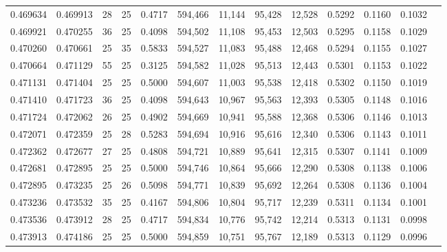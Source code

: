 \begin{tabular}{rrrrrrrrrrrrr}
0.469634 & 0.469913 &    28 &  25 &                                     0.4717 & 594,466 &  11,144 &  95,428 &  12,528 & 0.5292 & 0.1160 & 0.1032 \\
0.469921 & 0.470255 &    36 &  25 &                                     0.4098 & 594,502 &  11,108 &  95,453 &  12,503 & 0.5295 & 0.1158 & 0.1029 \\
0.470260 & 0.470661 &    25 &  35 &                                     0.5833 & 594,527 &  11,083 &  95,488 &  12,468 & 0.5294 & 0.1155 & 0.1027 \\
0.470664 & 0.471129 &    55 &  25 &                                     0.3125 & 594,582 &  11,028 &  95,513 &  12,443 & 0.5301 & 0.1153 & 0.1022 \\
0.471131 & 0.471404 &    25 &  25 &                                     0.5000 & 594,607 &  11,003 &  95,538 &  12,418 & 0.5302 & 0.1150 & 0.1019 \\
0.471410 & 0.471723 &    36 &  25 &                                     0.4098 & 594,643 &  10,967 &  95,563 &  12,393 & 0.5305 & 0.1148 & 0.1016 \\
0.471724 & 0.472062 &    26 &  25 &                                     0.4902 & 594,669 &  10,941 &  95,588 &  12,368 & 0.5306 & 0.1146 & 0.1013 \\
0.472071 & 0.472359 &    25 &  28 &                                     0.5283 & 594,694 &  10,916 &  95,616 &  12,340 & 0.5306 & 0.1143 & 0.1011 \\
0.472362 & 0.472677 &    27 &  25 &                                     0.4808 & 594,721 &  10,889 &  95,641 &  12,315 & 0.5307 & 0.1141 & 0.1009 \\
0.472681 & 0.472895 &    25 &  25 &                                     0.5000 & 594,746 &  10,864 &  95,666 &  12,290 & 0.5308 & 0.1138 & 0.1006 \\
0.472895 & 0.473235 &    25 &  26 &                                     0.5098 & 594,771 &  10,839 &  95,692 &  12,264 & 0.5308 & 0.1136 & 0.1004 \\
0.473236 & 0.473532 &    35 &  25 &                                     0.4167 & 594,806 &  10,804 &  95,717 &  12,239 & 0.5311 & 0.1134 & 0.1001 \\
0.473536 & 0.473912 &    28 &  25 &                                     0.4717 & 594,834 &  10,776 &  95,742 &  12,214 & 0.5313 & 0.1131 & 0.0998 \\
0.473913 & 0.474186 &    25 &  25 &                                     0.5000 & 594,859 &  10,751 &  95,767 &  12,189 & 0.5313 & 0.1129 & 0.0996 \\

\end{tabular}
